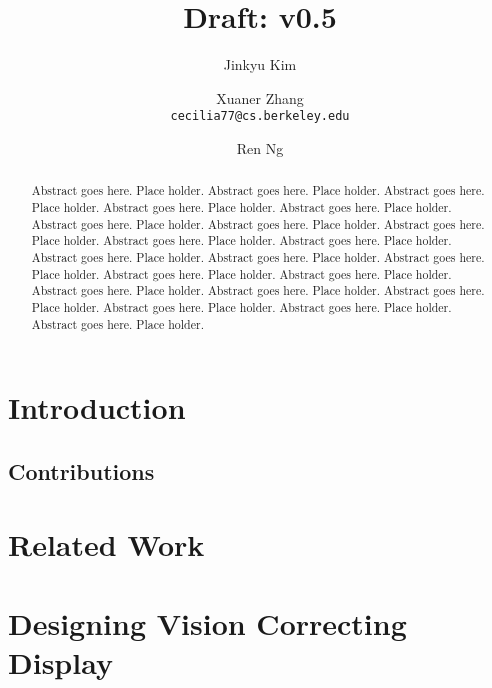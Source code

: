 \documentclass[10pt,twocolumn,letterpaper]{article}
\begin{document}
\title{Draft: v0.5}

\author{
Jinkyu Kim\\
\and
Xuaner Zhang\\
{\tt\small cecilia77@cs.berkeley.edu}
\and
Ren Ng\\
}

\maketitle
\thispagestyle{empty}

\begin{abstract}
   Abstract goes here. Place holder. Abstract goes here. Place holder. Abstract goes here. Place holder. Abstract goes here. Place holder. Abstract goes here. Place holder. Abstract goes here. Place holder. Abstract goes here. Place holder. Abstract goes here. Place holder. Abstract goes here. Place holder. Abstract goes here. Place holder. Abstract goes here. Place holder. Abstract goes here. Place holder. Abstract goes here. Place holder. Abstract goes here. Place holder. Abstract goes here. Place holder. Abstract goes here. Place holder. Abstract goes here. Place holder. Abstract goes here. Place holder. Abstract goes here. Place holder. Abstract goes here. Place holder. Abstract goes here. Place holder.
\end{abstract}

\section{Introduction}



\subsection{Contributions}



\section{Related Work}



\section{Designing Vision Correcting Display}
\end{document}
